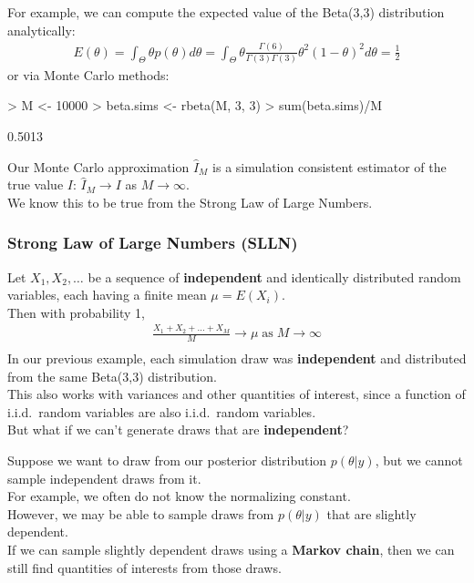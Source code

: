 \documentclass[handout]{beamer}
\begin{document}
\begin{frame}[fragile]
For example, we can compute the expected value of the Beta(3,3)
distribution analytically:
\pause
\begin{eqnarray*}
E(\theta) = \int_{\Theta} \theta p(\theta) d\theta =
\int_{\Theta} \theta \frac{\Gamma(6)}{\Gamma(3) \Gamma(3)} \theta^{2}
(1-\theta)^2 d\theta = \frac{1}{2}
\end{eqnarray*}
\pause
or via Monte Carlo methods:
\pause
\medskip
\tiny
\begin{Schunk}
\begin{Sinput}
> M <- 10000
> beta.sims <- rbeta(M, 3, 3)
> sum(beta.sims)/M
\end{Sinput}
\begin{Soutput}
[1] 0.5013
\end{Soutput}
\end{Schunk}
\pause
\normalsize
Our Monte Carlo approximation $\hat{I}_M$ is a simulation consistent
estimator of the true value $I$: \pause $\hat{I}_M
\rightarrow I$ as $M \rightarrow \infty$.\\
\bigskip
\pause
We know this to be true from the Strong Law of Large Numbers.
\end{frame}

\begin{frame}
\frametitle{Strong Law of Large Numbers (SLLN)}
\pause
Let $X_1, X_2, \dots$ be a sequence of \textbf{independent} and
identically distributed random variables, each having a finite mean
$\mu = E(X_i)$.\\
\bigskip
Then with probability 1,
\begin{eqnarray*}
\frac{X_1 + X_2 + \dots + X_M}{M} \rightarrow \mu \; \mathrm{as} \; M
\rightarrow \infty\\
\end{eqnarray*}
\pause
In our previous example, each simulation draw was \textbf{independent} and
distributed from the same Beta(3,3) distribution.\\
\bigskip
\pause
This also works with variances and other quantities of interest, since a
function of i.i.d.\ random variables are also i.i.d.\ random variables.\\
\bigskip
\pause
But what if we can't generate draws that are \textbf{independent}?

\end{frame}

\begin{frame}
Suppose we want to draw from our posterior distribution $p(\theta |
y)$, but we cannot sample independent draws from it.\\
\bigskip
\pause
For example, we often do not know the normalizing constant.\\
\bigskip
\pause
However, we may be able to sample draws from $p(\theta | y)$ that are
slightly dependent.\\
\bigskip
\pause
If we can sample slightly dependent draws using a \textbf{Markov
chain}, then we can still find quantities of interests from those draws.
\end{frame}
\end{document}
